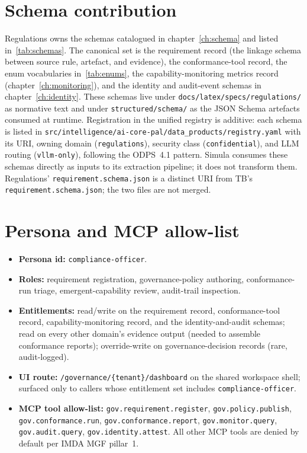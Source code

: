 \documentclass[11pt,a4paper,twoside]{report}
\begin{document}
\section{Schema contribution}
\label{sec:agent-schema-contrib}
Regulations owns the schemas catalogued in chapter~\ref{ch:schema}
and listed in~\ref{tab:schemas}. The canonical set is the
requirement record (the linkage schema between source rule, artefact,
and evidence), the conformance-tool record, the enum vocabularies
in~\ref{tab:enums}, the capability-monitoring metrics record
(chapter~\ref{ch:monitoring}), and the identity and audit-event
schemas in chapter~\ref{ch:identity}. These schemas live under
\texttt{docs/latex/specs/regulations/} as normative text and under
\texttt{structured/schema/} as the JSON Schema artefacts consumed at
runtime. Registration in the unified registry is additive: each
schema is listed in
\texttt{src/intelligence/ai-core-pal/data\_products/registry.yaml}
with its URI, owning domain (\texttt{regulations}), security class
(\texttt{confidential}), and LLM routing (\texttt{vllm-only}),
following the ODPS~4.1 pattern. Simula consumes these schemas
directly as inputs to its extraction pipeline; it does not transform
them. Regulations' \texttt{requirement.schema.json} is a distinct
URI from TB's \texttt{requirement.schema.json}; the two files are
not merged.

\section{Persona and MCP allow-list}
\label{sec:agent-persona}
\begin{itemize}
\item \textbf{Persona id:} \texttt{compliance-officer}.
\item \textbf{Roles:} requirement registration, governance-policy
authoring, conformance-run triage, emergent-capability review,
audit-trail inspection.
\item \textbf{Entitlements:} read/write on the requirement record,
conformance-tool record, capability-monitoring record, and the
identity-and-audit schemas; read on every other domain's
evidence output (needed to assemble conformance reports);
override-write on governance-decision records (rare, audit-logged).
\item \textbf{UI route:} \texttt{/governance/\{tenant\}/dashboard}
on the shared workspace shell; surfaced only to callers whose
entitlement set includes \texttt{compliance-officer}.
\item \textbf{MCP tool allow-list:}
\texttt{gov.requirement.register}, \texttt{gov.policy.publish},
\texttt{gov.conformance.run}, \texttt{gov.conformance.report},
\texttt{gov.monitor.query}, \texttt{gov.audit.query},
\texttt{gov.identity.attest}. All other MCP tools are denied by
default per IMDA MGF pillar~1.
\end{itemize}
\end{document}
